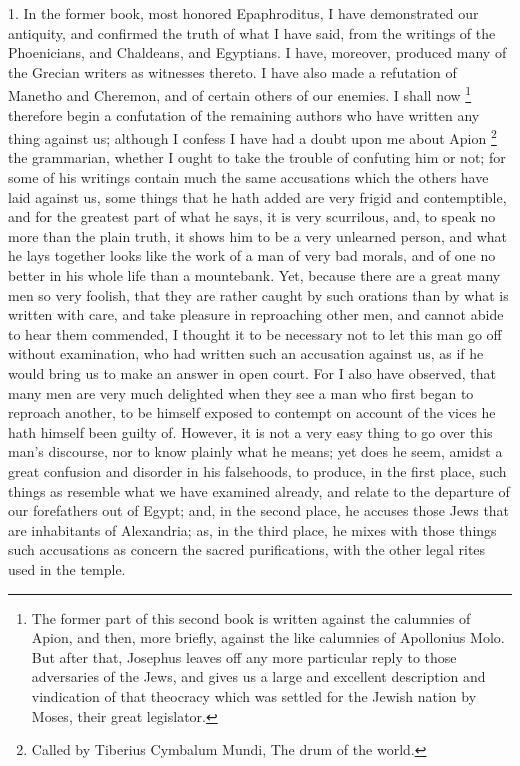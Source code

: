
1. In the former book, most honored Epaphroditus, I have demonstrated our
antiquity, and confirmed the truth of what I have said, from the writings
of the Phoenicians, and Chaldeans, and Egyptians. I have, moreover,
produced many of the Grecian writers as witnesses thereto. I have also
made a refutation of Manetho and Cheremon, and of certain others of our
enemies. I shall now \footnote{The former part of this
second book is written against the calumnies of Apion, and then, more
briefly, against the like calumnies of Apollonius Molo. But after that,
Josephus leaves off any more particular reply to those adversaries of the
Jews, and gives us a large and excellent description and vindication of
that theocracy which was settled for the Jewish nation by Moses, their
great legislator.} therefore begin a confutation of
the remaining authors who have written any thing against us; although I
confess I have had a doubt upon me about Apion \footnote{Called by Tiberius
Cymbalum Mundi, The drum of the world.} the
grammarian, whether I ought to take the trouble of confuting him or not;
for some of his writings contain much the same accusations which the
others have laid against us, some things that he hath added are very
frigid and contemptible, and for the greatest part of what he says, it is
very scurrilous, and, to speak no more than the plain truth, it shows him
to be a very unlearned person, and what he lays together looks like the
work of a man of very bad morals, and of one no better in his whole life
than a mountebank. Yet, because there are a great many men so very
foolish, that they are rather caught by such orations than by what is
written with care, and take pleasure in reproaching other men, and cannot
abide to hear them commended, I thought it to be necessary not to let this
man go off without examination, who had written such an accusation against
us, as if he would bring us to make an answer in open court. For I also
have observed, that many men are very much delighted when they see a man
who first began to reproach another, to be himself exposed to contempt on
account of the vices he hath himself been guilty of. However, it is not a
very easy thing to go over this man's discourse, nor to know plainly what
he means; yet does he seem, amidst a great confusion and disorder in his
falsehoods, to produce, in the first place, such things as resemble what
we have examined already, and relate to the departure of our forefathers
out of Egypt; and, in the second place, he accuses those Jews that are
inhabitants of Alexandria; as, in the third place, he mixes with those
things such accusations as concern the sacred purifications, with the
other legal rites used in the temple.

